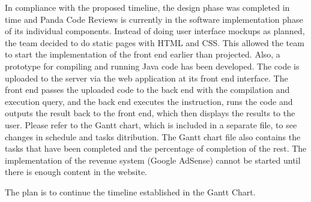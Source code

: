 

In compliance with the proposed timeline, the design phase was completed in time
and Panda Code Reviews is currently in the software implementation phase of its
individual components. Instead of doing user interface mockups as planned, the
team decided to do static pages with HTML and CSS. This allowed the team to
start the implementation of the front end earlier than projected. Also, a
prototype for compiling and running Java code has been developed. The code is
uploaded to the server via the web application at its front end interface. The
front end passes the uploaded code to the back end with the compilation and
execution query, and the back end executes the instruction, runs the code and
outputs the result back to the front end, which then displays the results to the
user. Please refer to the Gantt chart, which is included in a separate file, to
see changes in schedule and tasks ditribution. The Gantt chart file also
contains the tasks that have been completed and the percentage of completion of
the rest. The implementation of the revenue system (Google AdSense) cannot be
started until there is enough content in the website.

The plan is to continue the timeline established in the Gantt Chart. 